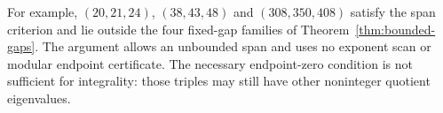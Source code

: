 For example, $(20,21,24)$, $(38,43,48)$ and $(308,350,408)$ satisfy
the span criterion and lie outside the four fixed-gap families of
Theorem~\ref{thm:bounded-gaps}. The argument allows an unbounded span
and uses no exponent scan or modular endpoint certificate. The necessary
endpoint-zero condition is not sufficient for integrality: those
triples may still have other noninteger quotient eigenvalues.

